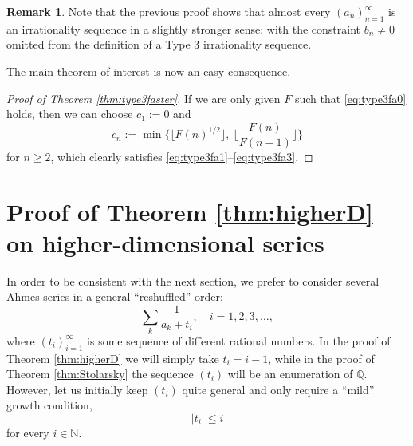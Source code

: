 \documentclass[11pt,letterpaper,reqno]{amsart}
\numberwithin{equation}{section}
\theoremstyle{definition}
\newtheorem{remark}[theorem]{Remark}
\numberwithin{equation}{section}
\begin{document}
\begin{remark}\label{rem:type3}
Note that the previous proof shows that almost every $(a_n)_{n=1}^{\infty}$ is an irrationality sequence in a slightly stronger sense: with the constraint $b_n\neq 0$ omitted from the definition of a Type 3 irrationality sequence.
\end{remark}

The main theorem of interest is now an easy consequence.

\begin{proof}[Proof of Theorem \ref{thm:type3faster}]
If we are only given $F$ such that \eqref{eq:type3fa0} holds, then we can choose $c_1:=0$ and
\[ c_n := \min \biggl\{\bigl\lfloor F(n)^{1/2} \bigr\rfloor,\
\biggl\lfloor\frac{F(n)}{F(n-1)}\biggr\rfloor \biggr\} \]
for $n\geqslant 2$, which clearly satisfies \eqref{eq:type3fa1}--\eqref{eq:type3fa3}.
\end{proof}


\section{Proof of Theorem \ref{thm:higherD} on higher-dimensional series}
\label{sec:proofhigher}

In order to be consistent with the next section, we prefer to consider several Ahmes series in a general ``reshuffled'' order:
\[ \sum_k \frac{1}{a_k + t_i}, \quad i=1,2,3,\ldots, \]
where $(t_i)_{i=1}^{\infty}$ is some sequence of different rational numbers.
In the proof of Theorem \ref{thm:higherD} we will simply take $t_i=i-1$, while in the proof of Theorem \ref{thm:Stolarsky} the sequence $(t_i)$ will be an enumeration of $\mathbb{Q}$. However, let us initially keep $(t_i)$ quite general and only require a ``mild'' growth condition,
\begin{equation}\label{eq:growthcond}
|t_i| \leqslant i
\end{equation}
for every $i\in\mathbb{N}$.
\end{document}
